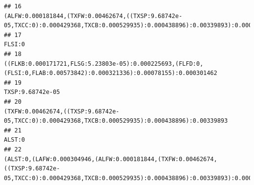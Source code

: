 \documentclass[]{article}
\begin{document}
\begin{verbatim}
## 16                                                                                                                                                                                                                                                                                  (ALFW:0.000181844,(TXFW:0.00462674,((TXSP:9.68742e-05,TXCC:0):0.000429368,TXCB:0.000529935):0.000438896):0.00339893):0.000450879
## 17                                                                                                                                                                                                                                                                                                                                                                                                            FLSI:0
## 18                                                                                                                                                                                                                                                                                            ((FLKB:0.000171721,FLSG:5.23803e-05):0.000225693,(FLFD:0,(FLSI:0,FLAB:0.00573842):0.000321336):0.00078155):0.000301462
## 19                                                                                                                                                                                                                                                                                                                                                                                                  TXSP:9.68742e-05
## 20                                                                                                                                                                                                                                                                                                                 (TXFW:0.00462674,((TXSP:9.68742e-05,TXCC:0):0.000429368,TXCB:0.000529935):0.000438896):0.00339893
## 21                                                                                                                                                                                                                                                                                                                                                                                                            ALST:0
## 22                                                                                                                                                                                                                               (ALST:0,(LAFW:0.000304946,(ALFW:0.000181844,(TXFW:0.00462674,((TXSP:9.68742e-05,TXCC:0):0.000429368,TXCB:0.000529935):0.000438896):0.00339893):0.000450879):0.000633288):0.00274534

\end{verbatim}
\end{document}
